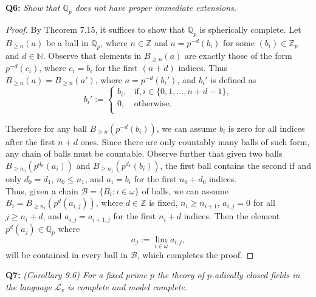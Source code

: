 \documentclass{article}
\begin{document}
\textbf{Q6:} \it Show that $\mathbb{Q}_p$ does not have proper immediate
  extensions.
  \begin{proof}
    By Theorem 7.15, it suffices to show that $\mathbb{Q}_p$ is spherically
    complete. Let $B_{\geq n}(a)$ be a ball in $\mathbb{Q}_p$, where
    $n\in\mathbb{Z}$ and $a=p^{-d}(b_i)$ for some $(b_i)\in\mathbb{Z}_p$
    and $d\in\mathbb{N}$. Observe that elements in $B_{\geq n}(a)$ are
    exactly those of the form $p^{-d}(c_i)$, where $c_i=b_i$ for the first
    $(n+d)$ indices. Thus $B_{\geq n}(a)=B_{\geq n}(a')$, where
    $a=p^{-d}(b_i')$, and $b_i'$ is defined as
    \begin{equation*}
      b_i':=
      \begin{cases}
        b_i, &\text{if}, i\in\{0,1,\ldots,n+d-1\},\\
        0, &\text{otherwise}.\\
      \end{cases}
    \end{equation*}

    Therefore for any ball $B_{\geq n}(p^{-d}(b_i))$, we can assume $b_i$
    is zero for all indices after the first $n+d$ ones. Since there are
    only countably many balls of such form, any chain of balls must be
    countable. Observe further that given two balls $B_{\geq
    n_0}(p^{d_0}(a_i))$ and $B_{\geq n_1}(p^{d_1}(b_i))$, the first ball
    contains the second if and only $d_0=d_1$, $n_0\leq n_1$, and $a_i=b_i$
    for the first $n_0+d_0$ indices. \\

    Thus, given a chain $\mathcal{B}=\{B_i:i\in\omega\}$ of balls, we can
    assume $B_i=B_{\geq n_i}(p^d(a_{i,j}))$, where $d\in\mathbb{Z}$ is
    fixed, $n_i\geq n_{i+1}$, $a_{i,j}=0$ for all $j\geq n_i+d$, and
    $a_{i,j}=a_{i+1,j}$ for the first $n_i+d$ indices. Then the element
    $p^d(a_j)\in\mathbb{Q}_p$ where
    \[a_j :=\lim_{i\in\omega} a_{i,j},\]
    will be contained in every ball in $\mathcal{B}$, which completes the
    proof.
  \end{proof}

\textbf{Q7:} \it (Corollary 9.6) For a fixed prime $p$ the theory of
  $p$-adically closed fields in the language $\mathcal{L}_v$ is complete
  and model complete.
\end{document}
